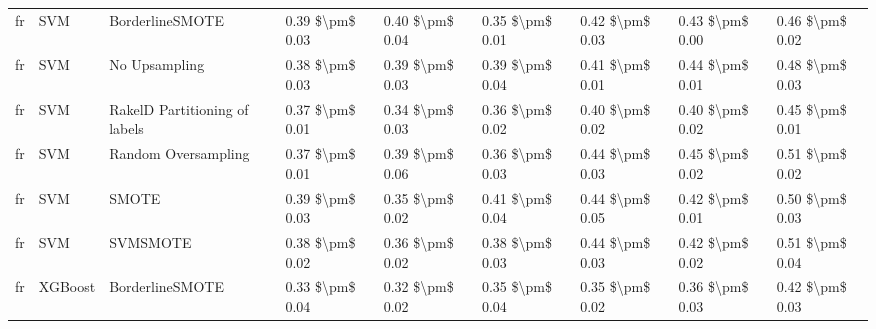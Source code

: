 \begin{tabular}{lllllllll}
      fr &                             SVM &               BorderlineSMOTE & 0.39 \$\textbackslash pm\$ 0.03 &           0.40 \$\textbackslash pm\$ 0.04 &       0.35 \$\textbackslash pm\$ 0.01 &        0.42 \$\textbackslash pm\$ 0.03 &                         0.43 \$\textbackslash pm\$ 0.00 &     0.46 \$\textbackslash pm\$ 0.02 \\
      fr &                             SVM &                 No Upsampling & 0.38 \$\textbackslash pm\$ 0.03 &           0.39 \$\textbackslash pm\$ 0.03 &       0.39 \$\textbackslash pm\$ 0.04 &        0.41 \$\textbackslash pm\$ 0.01 &                         0.44 \$\textbackslash pm\$ 0.01 &     0.48 \$\textbackslash pm\$ 0.03 \\
      fr &                             SVM & RakelD Partitioning of labels & 0.37 \$\textbackslash pm\$ 0.01 &           0.34 \$\textbackslash pm\$ 0.03 &       0.36 \$\textbackslash pm\$ 0.02 &        0.40 \$\textbackslash pm\$ 0.02 &                         0.40 \$\textbackslash pm\$ 0.02 &     0.45 \$\textbackslash pm\$ 0.01 \\
      fr &                             SVM &           Random Oversampling & 0.37 \$\textbackslash pm\$ 0.01 &           0.39 \$\textbackslash pm\$ 0.06 &       0.36 \$\textbackslash pm\$ 0.03 &        0.44 \$\textbackslash pm\$ 0.03 &                         0.45 \$\textbackslash pm\$ 0.02 &     0.51 \$\textbackslash pm\$ 0.02 \\
      fr &                             SVM &                         SMOTE & 0.39 \$\textbackslash pm\$ 0.03 &           0.35 \$\textbackslash pm\$ 0.02 &       0.41 \$\textbackslash pm\$ 0.04 &        0.44 \$\textbackslash pm\$ 0.05 &                         0.42 \$\textbackslash pm\$ 0.01 &     0.50 \$\textbackslash pm\$ 0.03 \\
      fr &                             SVM &                      SVMSMOTE & 0.38 \$\textbackslash pm\$ 0.02 &           0.36 \$\textbackslash pm\$ 0.02 &       0.38 \$\textbackslash pm\$ 0.03 &        0.44 \$\textbackslash pm\$ 0.03 &                         0.42 \$\textbackslash pm\$ 0.02 &     0.51 \$\textbackslash pm\$ 0.04 \\
      fr &                         XGBoost &               BorderlineSMOTE & 0.33 \$\textbackslash pm\$ 0.04 &           0.32 \$\textbackslash pm\$ 0.02 &       0.35 \$\textbackslash pm\$ 0.04 &        0.35 \$\textbackslash pm\$ 0.02 &                         0.36 \$\textbackslash pm\$ 0.03 &     0.42 \$\textbackslash pm\$ 0.03 \\

\end{tabular}
